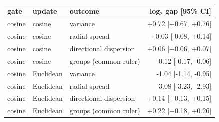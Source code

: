 \begin{tabular}{lllr}
\toprule
gate & update & outcome & log$_2$ gap [95\% CI] \\
\midrule
cosine & cosine & variance & +0.72 [+0.67, +0.76] \\
cosine & cosine & radial spread & +0.03 [-0.08, +0.14] \\
cosine & cosine & directional dispersion & +0.06 [+0.06, +0.07] \\
cosine & cosine & groups (common ruler) & -0.12 [-0.17, -0.06] \\
cosine & Euclidean & variance & -1.04 [-1.14, -0.95] \\
cosine & Euclidean & radial spread & -3.08 [-3.23, -2.93] \\
cosine & Euclidean & directional dispersion & +0.14 [+0.13, +0.15] \\
cosine & Euclidean & groups (common ruler) & +0.22 [+0.18, +0.26] \\
\bottomrule
\end{tabular}
